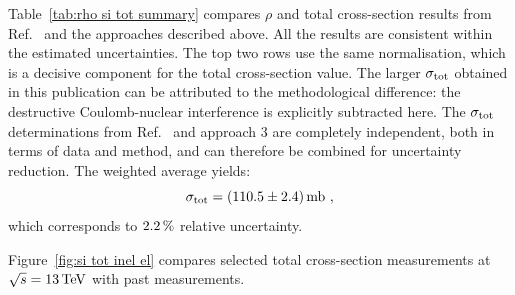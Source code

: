 Table~\ref{tab:rho si tot summary} compares $\rho$ and total cross-section results from Ref.~\cite{totem-13tev-90m} and the approaches described above. All the results are consistent within the estimated uncertainties. The top two rows use the same normalisation, which is a decisive component for the total cross-section value. The larger $\sigma_{\rm tot}$ obtained in this publication can be attributed to the methodological difference: the destructive Coulomb-nuclear interference is explicitly subtracted here. The $\sigma_{\rm tot}$ determinations from Ref.~\cite{totem-13tev-90m} and approach 3 are completely independent, both in terms of data and method, and can therefore be combined for uncertainty reduction. The weighted average yields:
\begin{equation}
\label{eq:si tot comb}
\sigma_{\rm tot} = (110.5 \pm 2.4)\,{\rm mb}\ ,
\end{equation}
which corresponds to $2.2\,{\rm \%}$ relative uncertainty.

Figure~\ref{fig:si tot inel el} compares selected total cross-section measurements at $\sqrt s = 13\,{\rm TeV}$ with past measurements.
